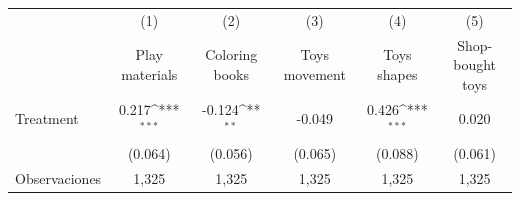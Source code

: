 {
\def\sym#1{\ifmmode^{#1}\else\(^{#1}\)\fi}
\begin{tabular}{l*{5}{c}}
\toprule
                    &\multicolumn{1}{c}{(1)}&\multicolumn{1}{c}{(2)}&\multicolumn{1}{c}{(3)}&\multicolumn{1}{c}{(4)}&\multicolumn{1}{c}{(5)}\\
                    &\multicolumn{1}{c}{Play materials}&\multicolumn{1}{c}{Coloring books}&\multicolumn{1}{c}{Toys movement}&\multicolumn{1}{c}{Toys shapes}&\multicolumn{1}{c}{Shop-bought toys}\\
\midrule
Treatment           &       0.217\sym{***}&      -0.124\sym{**} &      -0.049         &       0.426\sym{***}&       0.020         \\
                    &     (0.064)         &     (0.056)         &     (0.065)         &     (0.088)         &     (0.061)         \\
\midrule
Observaciones       &       1,325         &       1,325         &       1,325         &       1,325         &       1,325         \\
\bottomrule
\end{tabular}
}
